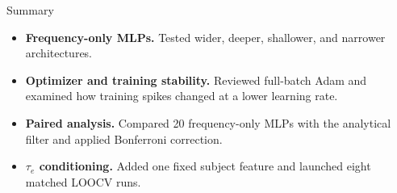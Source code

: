 \documentclass[aspectratio=169,11pt]{beamer}
\newenvironment{canvas}{\begin{tikzpicture}[remember picture,overlay,shift={(current page.north west)},x=1cm,y=-1cm]}{\end{tikzpicture}}
\begin{document}
\begin{frame}[t]{Summary}
\begin{itemize}
\item \textbf{Frequency-only MLPs.} Tested wider, deeper, shallower, and narrower architectures.
\item \textbf{Optimizer and training stability.} Reviewed full-batch Adam and examined how training spikes changed at a lower learning rate.
\item \textbf{Paired analysis.} Compared 20 frequency-only MLPs with the analytical filter and applied Bonferroni correction.
\item \textbf{$\tau_e$ conditioning.} Added one fixed subject feature and launched eight matched LOOCV runs.
\end{itemize}
\end{frame}
\end{document}
